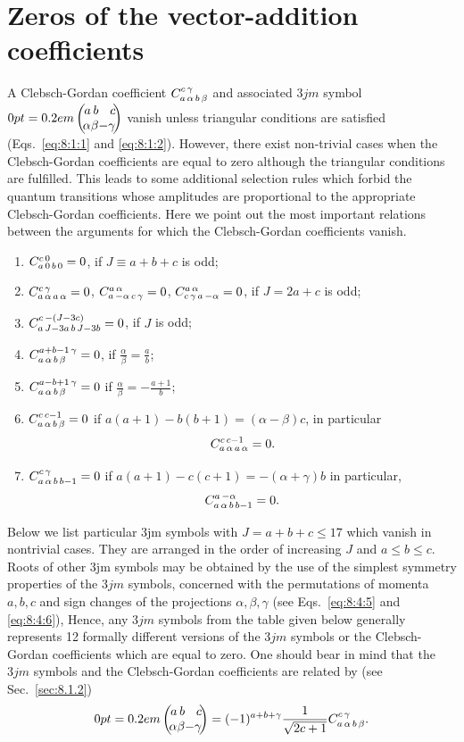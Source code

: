 \section{Zeros of the vector-addition coefficients}\label{sec:8.10}
A Clebsch-Gordan coefficient $C_{a\,\alpha\,b\,\beta}^{c\,\gamma}$ and associated $3 j m$ symbol $\threej{a}{b}{c}{\alpha}{\beta}{-\gamma}$ vanish unless triangular conditions are satisfied (Eqs.~\eqref{eq:8:1:1} and \eqref{eq:8:1:2}). However, there exist non-trivial cases when the Clebsch-Gordan coefficients are equal to zero although the triangular conditions are fulfilled. This leads to some additional selection rules which forbid the quantum transitions whose amplitudes are proportional to the appropriate Clebsch-Gordan coefficients. Here we point out the most important relations between the arguments for which the Clebsch-Gordan coefficients vanish.
\begin{enumerate}[label=(\alph*)]
\item $C_{a\,0\,b\,0}^{c\,0}=0$, if $J \equiv a+b+c$ is odd;
\item $C_{a\,\alpha\,a\,\alpha}^{c\,\gamma}=0$, $C_{a\,-\alpha\,c\,\gamma}^{a\,\alpha}=0$, $C_{c\,\gamma\,a\,-\alpha}^{a\,\alpha}=0$, if $J=2 a+c$ is odd;
\item $C_{a\,J-3 a\,b\,J-3 b}^{c\,-(J-3 c)}=0$, if $J$ is odd;
\item $C_{a\,\alpha\,b\,\beta}^{a+b-1\,\gamma}=0$, if $\frac{\alpha}{\beta}=\frac{a}{b}$;
\item $C_{a\,\alpha\,b\,\beta}^{a-b+1\,\gamma}=0$ if $\frac{\alpha}{\beta}=-\frac{a+1}{b}$;
\item $C_{a\,\alpha\,b\,\beta}^{c\,c-1}=0$ if $a(a+1)-b(b+1)=(\alpha-\beta) c$, in particular
\[
C_{a\,\alpha\,a\,\alpha}^{c\,c-1}=0 .
\]
\item $C_{a\,\alpha\,b\,b-1}^{c\,\gamma}=0$ if $a(a+1)-c(c+1)=-(\alpha+\gamma) b$ in particular,
\[
C_{a\,\alpha\,b\,b-1}^{a\,-\alpha}=0 .
\]
\end{enumerate}
Below we list particular 3jm symbols with $J=a+b+c \leq 17$ which vanish in nontrivial cases. They are arranged in the order of increasing $J$ and $a \leq b \leq c$. Roots of other 3jm symbols may be obtained by the use of the simplest symmetry properties of the $3 j m$ symbols, concerned with the permutations of momenta $a, b, c$ and sign changes of the projections $\alpha, \beta, \gamma$ (see Eqs.~\eqref{eq:8:4:5} and \eqref{eq:8:4:6}), Hence, any $3 j m$ symbols from the table given below generally represents 12 formally different versions of the $3 j m$ symbols or the Clebsch-Gordan coefficients which are equal to zero. One should bear in mind that the $3 j m$ symbols and the Clebsch-Gordan coefficients are related by (see Sec.~\ref{sec:8.1.2})
\[
\threej{a}{b}{c}{\alpha}{\beta}{-\gamma}=(-1)^{a+b+\gamma} \frac{1}{\sqrt{2 c+1}} \clebsch{a}{\alpha}{b}{\beta}{c}{\gamma} .
\]
